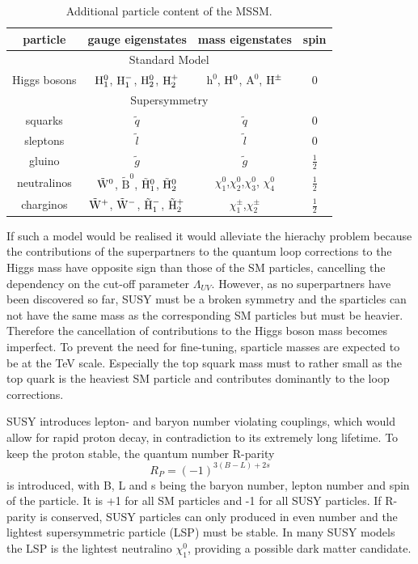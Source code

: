 \begin{table}
\centering
 \renewcommand{\arraystretch}{1.3}
\caption{Additional particle content of the MSSM.}
\label{tab:MSSM}
\begin{tabular}{c|c|c|c}
particle & gauge eigenstates  & mass eigenstates & spin   \\
\hline
\multicolumn{4}{c}{Standard Model} \\
\hline
Higgs bosons & $\mathrm{H}_1^0$, $\mathrm{H}_1^{-}$, $\mathrm{H}_2^0$, $\mathrm{H}_2^+$ & $\mathrm{h}^0$, $\mathrm{H}^0$, $\mathrm{A}^0$, $\mathrm{H}^{\pm}$ & 0 \\
\hline
\multicolumn{4}{c}{Supersymmetry} \\
\hline
squarks & $\tilde{q}$ & $\tilde{q}$ & 0 \\
sleptons & $\tilde{l}$ & $\tilde{l}$ & 0 \\
 gluino & $\tilde{g}$ & $\tilde{g}$ & $\frac{1}{2}$ \\
neutralinos & $\tilde{\mathrm{W}}^0$, $\tilde{\mathrm{B}}^0$, $\tilde{\mathrm{H}}_1^0$, $\tilde{\mathrm{H}}_2^0$ & $\chi^0_1$,$\chi^0_2$,$\chi^0_3$, $\chi^0_4$ & $\frac{1}{2}$\\
charginos & $\tilde{\mathrm{W}}^+$, $\tilde{\mathrm{W}}^-$, $\tilde{\mathrm{H}}_1^-$, $\tilde{\mathrm{H}}_2^+$ & $\chi^{\pm}_1$,$\chi^{\pm}_2$ & $\frac{1}{2}$ \\ 
\end{tabular}
\end{table} 

If such a model would be realised it would alleviate the hierachy problem because the contributions of the superpartners to the quantum loop corrections to the Higgs mass have opposite sign than those of the SM particles, cancelling the dependency on the cut-off parameter $\Lambda_{UV}$. However, as no superpartners have been discovered so far, SUSY must be a broken symmetry and the sparticles can not have the same mass as the corresponding SM particles but must be heavier. Therefore the cancellation of contributions to the Higgs boson mass becomes imperfect. To prevent the need for fine-tuning, sparticle masses are expected to be at the TeV scale. Especially the top squark mass must to rather small as the top quark is the heaviest SM particle and contributes dominantly to the loop corrections. 

SUSY introduces lepton- and baryon number violating couplings, which would allow for rapid proton decay, in contradiction to its extremely long lifetime. To keep the proton stable, the quantum number R-parity
\begin{equation}
R_P = (-1)^{3(B-L)+2s}
\end{equation} 
is introduced, with B, L and s being the baryon number, lepton number and spin of the particle. It is +1 for all SM particles and -1 for all SUSY particles. If R-parity is conserved, SUSY particles can only produced in even number and the lightest supersymmetric particle (LSP) must be stable. In many SUSY models the LSP is the lightest neutralino $\chi^0_1$, providing a possible dark matter candidate. 


